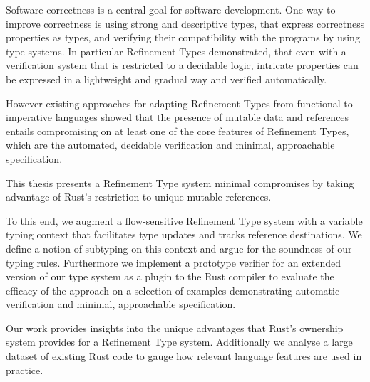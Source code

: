 
\Abstract

Software correctness is a central goal for software development.
One way to improve correctness is using strong and descriptive types, that express correctness properties as types, and verifying their compatibility with the programs by using type systems.
In particular Refinement Types demonstrated, that even with a verification system that is restricted to a decidable logic, intricate properties can be expressed in a lightweight and gradual way and verified automatically.

However existing approaches for adapting Refinement Types from functional to imperative languages showed that the presence of mutable data and references entails compromising on at least one of the core features of Refinement Types, which are the automated, decidable verification and minimal, approachable specification.

This thesis presents a Refinement Type system minimal compromises by taking advantage of Rust's restriction to unique mutable references.


To this end, we augment a flow-sensitive Refinement Type system with a variable typing context that facilitates type updates and tracks reference destinations. We define a notion of subtyping on this context and argue for the soundness of our typing rules. 
Furthermore we implement a prototype verifier for an extended version of our type system as a plugin to the Rust compiler to evaluate the efficacy of the approach on a selection of examples demonstrating automatic verification and minimal, approachable specification.

Our work provides insights into the unique advantages that Rust's ownership system provides for a Refinement Type system. Additionally we analyse a large dataset of existing Rust code to gauge how relevant language features are used in practice.

